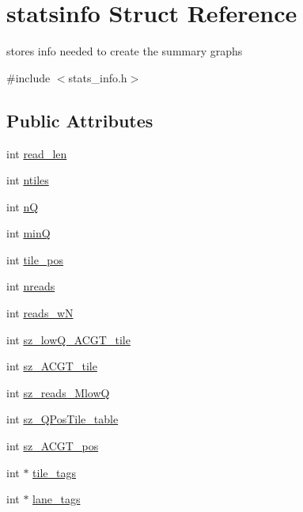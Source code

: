 \hypertarget{structstatsinfo}{\section{statsinfo Struct Reference}
\label{structstatsinfo}
}


stores info needed to create the summary graphs  




{\ttfamily \#include $<$stats\+\_\+info.\+h$>$}

\subsection*{Public Attributes}
\begin{DoxyCompactItemize}
\item 
int \hyperlink{structstatsinfo_a90c9a180632378e22ab9b0358daf3f0d}{read\+\_\+len}
\item 
int \hyperlink{structstatsinfo_abcfe8e12737ac99b724d4d4407204ec8}{ntiles}
\item 
int \hyperlink{structstatsinfo_a8f99f5ac1c3643e6ad59f124c11676e2}{n\+Q}
\item 
int \hyperlink{structstatsinfo_a6b33794a27827b8e2ea2b45a95f937d9}{min\+Q}
\item 
int \hyperlink{structstatsinfo_a740378fa01d92f6e0b2c50a26889fefd}{tile\+\_\+pos}
\item 
int \hyperlink{structstatsinfo_a2f01e91b444793507cb4173582e215bb}{nreads}
\item 
int \hyperlink{structstatsinfo_a14bb0b9848f2301718833bd2130683b7}{reads\+\_\+w\+N}
\item 
int \hyperlink{structstatsinfo_ae3c83d12e46748f3a0de4628b5e48068}{sz\+\_\+low\+Q\+\_\+\+A\+C\+G\+T\+\_\+tile}
\item 
int \hyperlink{structstatsinfo_a4e1223289cbb8f609d522747d4b47b54}{sz\+\_\+\+A\+C\+G\+T\+\_\+tile}
\item 
int \hyperlink{structstatsinfo_a5f0e812f7a2213cb57a79c8110b7a02e}{sz\+\_\+reads\+\_\+\+Mlow\+Q}
\item 
int \hyperlink{structstatsinfo_aceed3737e42259fa6e7438dc185e587f}{sz\+\_\+\+Q\+Pos\+Tile\+\_\+table}
\item 
int \hyperlink{structstatsinfo_ae95899480cc574a09163190663dd504a}{sz\+\_\+\+A\+C\+G\+T\+\_\+pos}
\item 
int $\ast$ \hyperlink{structstatsinfo_a25f475c79fa4d5aa1255b8c543d8a731}{tile\+\_\+tags}
\item 
int $\ast$ \hyperlink{structstatsinfo_a2fc74c1d7cec79d9b28b5e578d96d7a1}{lane\+\_\+tags}

\end{DoxyCompactItemize}
